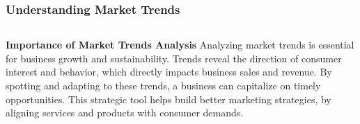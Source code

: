 \documentclass[5pt]{beamer}
\begin{document}
\begin{frame}
\frametitle{Understanding Market Trends}
\begin{columns}
\begin{column}{0.7\textwidth}
\begin{block}{\textbf{Importance of Market Trends Analysis}}
Analyzing market trends is essential for business growth and sustainability. Trends reveal the direction of consumer interest and behavior, which directly impacts business sales and revenue. By spotting and adapting to these trends, a business can capitalize on timely opportunities. This strategic tool helps build better marketing strategies, by aligning services and products with consumer demands.
\end{block}
\end{column}
\end{columns}
\end{frame}
\end{document}
